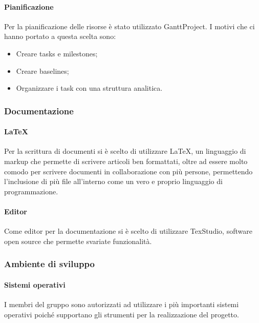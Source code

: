                         \paragraph{Pianificazione}
                            Per la pianificazione delle risorse è stato utilizzato GanttProject. I motivi che ci hanno portato a questa scelta sono:
                            \begin{itemize}
                                \item Creare tasks e milestones;
                                \item Creare baselines;
                                \item Organizzare i task con una struttura analitica.
                            \end{itemize}
                        \subsubsection{Documentazione}
                        \paragraph{\LaTeX} 
                            Per la scrittura di documenti si è scelto di utilizzare \LaTeX, un linguaggio di markup che permette di scrivere articoli ben formattati, oltre ad essere molto comodo per scrivere documenti in collaborazione con più persone, permettendo l'inclusione di più file all'interno come un vero e proprio linguaggio di programmazione.
                        \newline
                        \paragraph{Editor}
                            Come editor per la documentazione si è scelto di utilizzare TexStudio, software open source che permette svariate funzionalità.
                        \subsubsection{Ambiente di sviluppo}
                            \paragraph{Sistemi operativi}
                                I membri del gruppo sono autorizzati ad utilizzare i più importanti sistemi operativi poiché supportano gli strumenti per la realizzazione del progetto.
